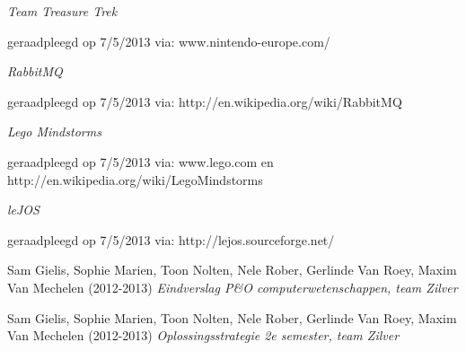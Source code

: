 \documentclass[eind]{penoverslag}
\begin{document}
\newpage
\begin{flushleft}
\begin{thebibliography}{9}

\textit{Team Treasure Trek}
\begin{scriptsize}
geraadpleegd op 7/5/2013 via: \mbox{www.nintendo-europe.com/}
\end{scriptsize}

\textit{RabbitMQ}
\begin{scriptsize}
geraadpleegd op 7/5/2013 via: \mbox{http://en.wikipedia.org/wiki/RabbitMQ}
\end{scriptsize}

\textit{Lego Mindstorms}
\begin{scriptsize}
geraadpleegd op 7/5/2013 via: \mbox{www.lego.com} en \mbox{http://en.wikipedia.org/wiki/Lego\textendash Mindstorms}
\end{scriptsize}

\textit{leJOS}
\begin{scriptsize}
geraadpleegd op 7/5/2013 via: \mbox{http://lejos.sourceforge.net/}
\end{scriptsize}

Sam Gielis, Sophie Marien, Toon Nolten, Nele Rober, Gerlinde Van Roey, Maxim Van Mechelen (2012-2013) \textit{Eindverslag P\&O computerwetenschappen, team Zilver}

Sam Gielis, Sophie Marien, Toon Nolten, Nele Rober, Gerlinde Van Roey, Maxim Van Mechelen (2012-2013) \textit{Oplossingsstrategie 2e semester, team Zilver}

\end{thebibliography}
\end{flushleft}
\end{document}
